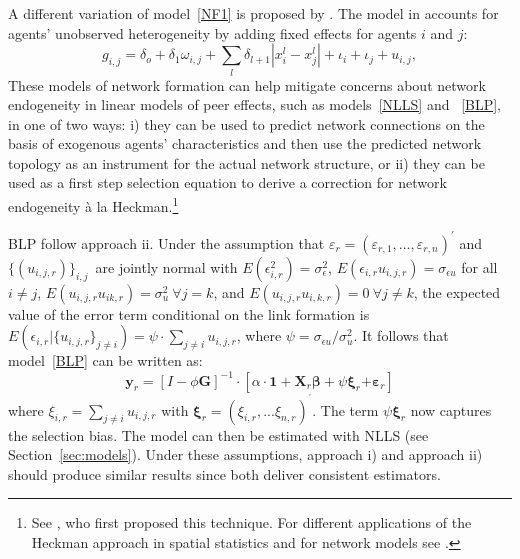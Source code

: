 \documentclass[nojss]{jss}
\begin{document}
A different variation of model~\ref{NF1} is proposed by \cite{Graham:2016}. The model in \cite{Graham:2016} accounts for agents' unobserved heterogeneity by adding fixed effects for agents $i$ and $j$:
\begin{equation}
g_{i,j}=\delta _{o}+\delta _{1}\omega _{i,j}+\sum_{l}\delta
_{l+1}|x_{i}^{l}-x_{j}^{l}|+\iota _{i}+\iota _{j}+u_{i,j},  \label{NF3}
\end{equation}
These models of network formation can help mitigate concerns about network endogeneity in linear models of peer effects, such as models~\ref{NLLS} and ~\ref{BLP}, in one of two ways: i) they can be used to predict network connections on the basis of exogenous agents' characteristics and then use the predicted network topology as an instrument for the actual network structure, or ii) they can be used as a first step selection equation to derive a correction for network endogeneity \`{a} la Heckman.\footnote{See \cite{Heckman:1979}, who first proposed this technique. For different applications of the Heckman approach in spatial statistics and for network models see \cite{Johnnson+Moon:2019,Qu+Lee:2015}.}

BLP follow approach ii. Under the assumption that $\varepsilon _{r}=(\varepsilon _{r,1},...,\varepsilon _{r, n})^{\prime}$ and $\{(u_{i,j,r})\}_{i,j}$\ are jointly
normal with $E(\epsilon _{i,r}^{2})=\sigma _{\epsilon }^{2}$, $E(\epsilon_{i,r}u_{i,j,r})=\sigma _{\epsilon u }$ for all $i\neq j$, $E(u_{i,j,r}u _{ik,r})=\sigma _{u }^{2}\ \forall j=k$, and $E(u_{i,j,r}u _{i,k,r})=0\ \forall j\neq k$, the expected value of the error term conditional on the link formation is $E(\epsilon _{i,r}|\{u_{i,j,r}\}_{j \neq i})=\psi \cdot \sum_{j\neq i}u _{i,j,r}$, where $\psi =\sigma _{\epsilon u }/\sigma _{u }^{2}$. It follows that model~\ref{BLP} can be written as:
\begin{equation}
\mathbf{y}_{r}=\left[ I-\phi \boldsymbol{G}\right] ^{-1}\cdot \left[ \alpha
\cdot \mathbf{1}+\boldsymbol{X}_{r}\mathbf{\beta +}\psi \mathbf{\xi }_{r}%
\mathbf{+\varepsilon }_{r}\right]   \label{final_0}
\end{equation}%
where $\xi _{i,r}=\sum_{j\neq i}u_{i,j,r}$ with $\mathbf{\xi }_{r}=(\xi_{i,r},...\xi _{n,r})^{^{\prime }}$. The term $\psi \mathbf{\xi }_{r}$ now captures the selection bias. The model can then be estimated with NLLS (see Section~\ref{sec:models}).
Under these assumptions, approach i) and approach ii) should produce similar results since both deliver consistent estimators.
\end{document}
